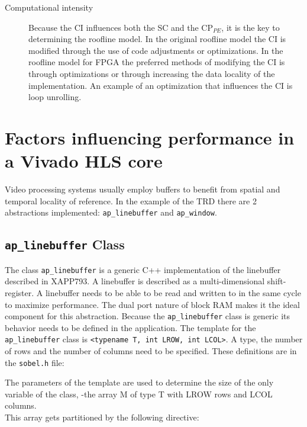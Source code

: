 \begin{description}
	\item[Computational intensity] Because the CI influences both the SC and the CP$_{PE}$, it is the key to determining the roofline model. In the original roofline model the CI is modified through the use of code adjustments or optimizations. In the roofline model for FPGA the preferred methods of modifying the CI is through optimizations or through increasing the data locality of the implementation. An example of an optimization that influences the CI is loop unrolling.

\end{description}

\section{Factors influencing performance in a Vivado HLS core}

Video processing systems usually employ buffers to benefit from spatial and temporal locality of reference. In the example of the TRD there are 2 abstractions implemented: \texttt{ap\_linebuffer} and \texttt{ap\_window}.

\subsection{\texttt{ap\_linebuffer} Class}

The class \texttt{ap\_linebuffer} is a generic C++ implementation of the linebuffer described in XAPP793. A linebuffer is described as a multi-dimensional shift-register. A linebuffer needs to be able to be read and written to in the same cycle to maximize performance. The dual port nature of block RAM makes it the ideal component for this abstraction.
Because the \texttt{ap\_linebuffer} class is generic its behavior needs to be defined in the application. The template for the \texttt{ap\_linebuffer} class is \texttt{<typename T, int LROW, int LCOL>}. A type, the number of rows and the number of columns need to be specified. These definitions are in the \texttt{sobel.h} file:




The parameters of the template are used to determine the size of the only variable of the class, -the array M of type T with LROW rows and LCOL columns.\\
This array gets partitioned by the following directive:




